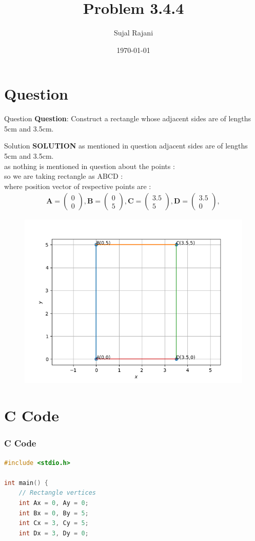 \documentclass{beamer}
\title{Problem 3.4.4}
\author{Sujal Rajani}
\date{\today}
\let\vec\mathbf
\theoremstyle{remark}
\newcommand{\myvec}[1]{\ensuremath{\begin{pmatrix}#1\end{pmatrix}}}
\numberwithin{equation}{section}
\begin{document}
\begin{frame}
\titlepage
\end{frame}

\section{Question}
\begin{frame}{Question}
\textbf{Question}:
\noindent Construct a rectangle whose adjacent sides are of lengths 5cm and 3.5cm.
\end{frame}
\begin{frame}{Solution}
\textbf{SOLUTION}
 as  mentioned in question adjacent sides are of lengths 5cm and 3.5cm.
 \\
as nothing is mentioned in question about the points :
\\
so we are taking rectangle as ABCD :
\\
 where position vector of respective points are :
 \\
 \begin{align*}
     \vec{A}=\myvec{0\\0}, \vec{B}=\myvec{0\\5}, \vec{C}=\myvec{3.5\\5},\vec{D}=\myvec{3.5\\0},
 \end{align*}
 \end{frame}    
       \begin{frame}[fragile]
    \begin{figure}[H]
    \centering
    \includegraphics[width = 0.6\columnwidth]{../figs/img.png}
    \caption*{}
    \label{figs}
\end{figure}
\end{frame}
\section{ C Code}
\begin{frame}[fragile]
\frametitle{C Code }
\begin{lstlisting}[language=C]
#include <stdio.h>

int main() {
    // Rectangle vertices
    int Ax = 0, Ay = 0;
    int Bx = 0, By = 5;
    int Cx = 3, Cy = 5;
    int Dx = 3, Dy = 0;

 

\end{lstlisting}
\end{frame}
\end{document}
